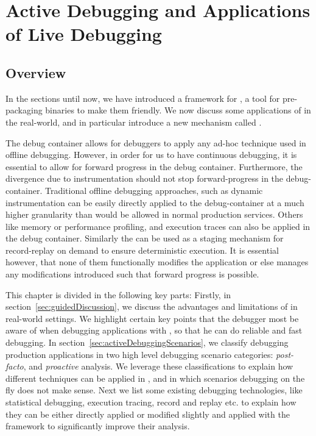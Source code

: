 \chapter{Active Debugging and Applications of Live Debugging}
\label{ch:activedebugging}

\section{Overview}
\label{sec:guided_overview}

In the sections until now, we have introduced a framework for \livedebugging, a tool for pre-packaging binaries to make them \livedebugging friendly. 
We now discuss some applications of \livedebugging in the real-world, and in particular introduce a new mechanism called \activedebugging.


The debug container allows for debuggers to apply any ad-hoc technique used in offline debugging.
However, in order for us to have continuous debugging, it is essential to allow for forward progress in the debug container. 
Furthermore, the divergence due to instrumentation should not stop forward-progress in the debug-container.
Traditional offline debugging approaches, such as dynamic instrumentation can be easily directly applied to the debug-container at a much higher granularity than would be allowed in normal production services. 
Others like memory or performance profiling, and execution traces can also be applied in the debug container.
Similarly the \debugcontainer can be used as a staging mechanism for record-replay on demand to ensure deterministic execution.
It is essential however, that none of them functionally modifies the application or else manages any modifications introduced such that forward progress is possible.

This chapter is divided in the following key parts: Firstly, in section~\ref{sec:guidedDiscussion}, we discuss the advantages and limitations of \parikshan in real-world settings.
We highlight certain key points that the debugger most be aware of when debugging applications with \parikshan, so that he can do reliable and fast debugging. 
In section~\ref{sec:activeDebuggingScenarios}, we classify debugging production applications in two high level debugging scenario categories: \emph{post-facto}, and \emph{proactive} analysis.
We leverage these classifications to explain how different techniques can be applied in \parikshan, and in which scenarios debugging on the fly does not make sense.
Next we list some existing debugging technologies, like statistical debugging, execution tracing, record and replay etc. to explain how they can be either directly applied or modified slightly and applied with the \parikshan framework to significantly improve their analysis.


